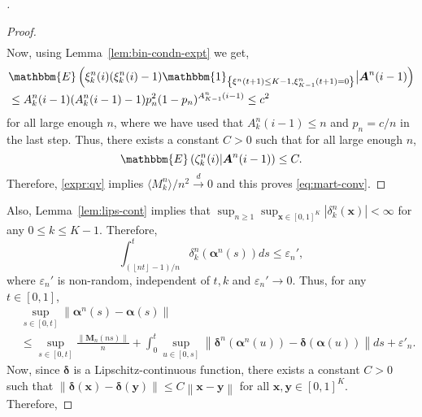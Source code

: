 \documentclass[11pt,a4paper, reqno]{article}
\begin{document}
\begin{proof}[\nopunct]
\begin{proof}
\begin{equation}
\begin{split}
  \end{split}
 \end{equation} Now, using Lemma~\ref{lem:bin-condn-expt} we get,
 \begin{equation}
 \begin{split}
  &{\mathbbm{E}\left({\xi_k^n(i)(\xi_k^n(i)-1){\ensuremath{\mathbbm{1}_{\left\{{\xi^n(t+1) \leq K-1, \xi^n_{{\scriptscriptstyle} K-1}(t+1)=0}\right\}}}}\big\vert{\ensuremath{\boldsymbol{{A}}}}^n(i-1)}\right)}\\
  &\leq  A_k^n(i-1)(A_k^n(i-1)-1)p_n^2(1-p_n)^{A_{{\scriptscriptstyle} K-1}^n(i-1)}\leq c^2
  \end{split}
 \end{equation} for all large enough $n$, where we have used that $A_k^n(i-1)\leq n$ and $p_n=c/n$ in the last step. Thus, there exists a constant $C>0$ such that for all large enough $n$,
 \begin{equation}
  {\mathbbm{E}\left({\zeta_k^n(i)|{\ensuremath{\boldsymbol{{A}}}}^n(i-1)}\right)}\leq C.
\end{equation}  Therefore, \eqref{expr:qv} implies $
  \langle M_k^n\rangle/n^2{\ensuremath{\xrightarrow{d}}} 0$ and this proves \eqref{eq:mart-conv}.
\end{proof} Also, Lemma~\ref{lem:lips-cont} implies that $\sup_{n\geq 1}\sup_{{\ensuremath{\boldsymbol{{x}}}}\in [0,1]^{K}}|\delta_k^n({\ensuremath{\boldsymbol{{x}}}})|<\infty $ for any $0\leq k\leq K-1$. Therefore,
 \begin{equation}
  \int_{({\ensuremath{\left\lfloor {nt} \right\rfloor}}-1)/n}^t\delta_k^n({\ensuremath{\boldsymbol{{\alpha}}}}^n(s))ds\leq \varepsilon_n',
 \end{equation}
 where $\varepsilon_n'$ is non-random, independent of $t,k$ and $\varepsilon_n'\to 0$. Thus, for any $t\in [0,1]$,
\begin{equation}\label{eq:alpha-diff}
\begin{split}
 &\sup_{s\in [0,t]}{\ensuremath{\left\|{{\ensuremath{\boldsymbol{{\alpha}}}}^n(s)-{\ensuremath{\boldsymbol{{\alpha}}}}(s)}\right\|}}\\
 &\leq \sup_{s\in [0,t]}\frac{{\ensuremath{\left\|{{\ensuremath{\boldsymbol{{M}}}}_n(ns)}\right\|}}}{n}+\int_0^t\sup_{u\in [0,s]}{\ensuremath{\left\|{{\ensuremath{\boldsymbol{{\delta}}}}^n({\ensuremath{\boldsymbol{{\alpha}}}}^n(u))-{\ensuremath{\boldsymbol{{\delta}}}}({\ensuremath{\boldsymbol{{\alpha}}}}(u))}\right\|}}ds +\varepsilon'_n.
 \end{split}
\end{equation} Now, since ${\ensuremath{\boldsymbol{{\delta}}}}$ is a Lipschitz-continuous function, there exists a constant $C>0$ such that ${\ensuremath{\left\|{{\ensuremath{\boldsymbol{{\delta}}}}({\ensuremath{\boldsymbol{{x}}}})-{\ensuremath{\boldsymbol{{\delta}}}}({\ensuremath{\boldsymbol{{y}}}})}\right\|}}\leq C {\ensuremath{\left\|{{\ensuremath{\boldsymbol{{x}}}}-{\ensuremath{\boldsymbol{{y}}}}}\right\|}}$ for all ${\ensuremath{\boldsymbol{{x}}}},{\ensuremath{\boldsymbol{{y}}}}\in [0,1]^K$. Therefore,

\end{proof}
\end{document}
